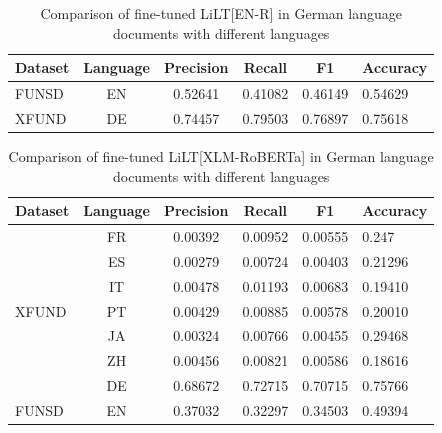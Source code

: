 \begin{table}[!ht]
    \centering
    \begin{tabular}{lccccl}
        \toprule
         \textbf{Dataset}& \textbf{Language}& \textbf{Precision}& \textbf{Recall}& \textbf{F1} & \textbf{Accuracy}  \\ \midrule
         FUNSD & EN & 0.52641 & 0.41082 & 0.46149 & 0.54629\\
         XFUND & DE &  0.74457 & 0.79503 & 0.76897 & 0.75618 \\ \bottomrule
    \end{tabular}
    \caption{Comparison of fine-tuned LiLT[EN-R] in German language documents with different languages}
    \label{tab:EN_R_on_different_languages}
\end{table}


\begin{table}[!ht]
    \centering
    \begin{tabular}{lccccl}
    \toprule
    \textbf{Dataset}& \textbf{Language} & \textbf{Precision} &\textbf{Recall} & \textbf{F1} & \textbf{Accuracy}\\ \midrule
    \multirow{7}{*}{XFUND} &FR  &0.00392  & 0.00952 &0.00555  &0.247  \\
                  &  ES&0.00279  &0.00724  &0.00403  &0.21296  \\
                  & IT& 0.00478 & 0.01193 & 0.00683 & 0.19410\\
                  & PT & 0.00429 & 0.00885 & 0.00578 & 0.20010\\
                  & JA & 0.00324 & 0.00766 & 0.00455 & 0.29468 \\
                  & ZH & 0.00456 & 0.00821 & 0.00586 & 0.18616\\
                  &DE & 0.68672& 0.72715&  0.70715& 0.75766 \\  \midrule
                FUNSD  & EN& 0.37032 & 0.32297 & 0.34503 & 0.49394\\ \bottomrule
                  
                                
    \end{tabular}
    \caption{Comparison of fine-tuned LiLT[XLM-RoBERTa] in German language documents with different languages}
    \label{tab:Eval_on_different_language}
\end{table}



